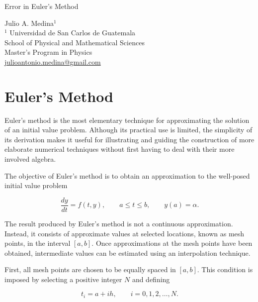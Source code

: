 \documentclass[a4paper]{article}
\begin{document}

\begin{center}
{\Large Error in Euler's Method\\}

\vspace{10pt}

{\large Julio A. Medina$^1$\\}
\vspace{10pt}
{\small
$^1$ Universidad de San Carlos de Guatemala\\
School of Physical and Mathematical Sciences\\
Master's Program in Physics\\
\href{mailto:julioantonio.medina@gmail.com}{julioantonio.medina@gmail.com}\\
}
\end{center}

\vspace{10pt}

\section{Euler's Method}

Euler's method is the most elementary technique for approximating the solution of an initial value problem. Although its practical use is limited, the simplicity of its derivation makes it useful for illustrating and guiding the construction of more elaborate numerical techniques without first having to deal with their more involved algebra.

The objective of Euler's method is to obtain an approximation to the well-posed initial value problem

\begin{equation}\label{prob1}
\frac{dy}{dt}=f(t,y), \qquad a\leq t\leq b, \qquad y(a)=\alpha.
\end{equation}

The result produced by Euler's method is not a continuous approximation. Instead, it consists of approximate values at selected locations, known as mesh points, in the interval $[a,b]$. Once approximations at the mesh points have been obtained, intermediate values can be estimated using an interpolation technique.

First, all mesh points are chosen to be equally spaced in $[a,b]$. This condition is imposed by selecting a positive integer $N$ and defining

\begin{equation*}
t_i=a+ih, \qquad i=0,1,2,\ldots,N.
\end{equation*}
\end{document}
